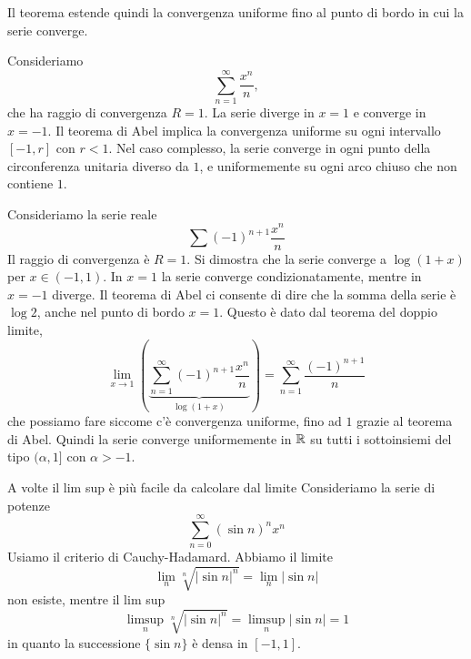 \documentclass[a4paper]{article}
\begin{document}
\begin{radioactive}
Il teorema estende quindi la convergenza uniforme fino al punto di bordo in cui la serie converge.
\end{radioactive}

\begin{radioactive}
\begin{snippetexample}{}
    Consideriamo
    \[
        \sum_{n=1}^\infty\frac{x^n}{n},
    \]
    che ha raggio di convergenza \(R=1\). La serie diverge in \(x=1\) e converge
    in \(x=-1\). Il teorema di Abel implica la convergenza uniforme su ogni
    intervallo \([-1,r]\) con \(r<1\). Nel caso complesso, la serie converge in ogni
    punto della circonferenza unitaria diverso da \(1\), e uniformemente su ogni arco
    chiuso che non contiene \(1\).
\end{snippetexample}
\end{radioactive}

\begin{radioactive}
\begin{snippetexample}{}
    Consideriamo la serie reale
    \[
        \sum {(-1)}^{n+1} \frac{x^n}{n}
    \]
    Il raggio di convergenza è \(R=1\).
    Si dimostra che la serie converge a \(\log(1 + x)\)
    per \(x \in (-1, 1)\).
    In \(x=1\) la serie converge condizionatamente, mentre in \(x=-1\) diverge.
    Il teorema di Abel ci consente di dire che la somma della serie è \(\log 2\),
    anche nel punto di bordo \(x=1\).
    Questo è dato dal teorema del doppio limite,
    \[
        \lim_{x\to 1} \left(
            \underbrace{\sum_{n=1}^\infty {(-1)}^{n+1} \frac{x^n}{n}}_{\log(1+x)}
        \right) = \sum_{n=1}^\infty \frac{{(-1)}^{n+1}}{n}
    \]
    che possiamo fare siccome c'è convergenza uniforme, fino ad \(1\)
    grazie al teorema di Abel.
    Quindi la serie converge uniformemente in \(\mathbb{R}\)
    su tutti i sottoinsiemi del tipo \((\alpha, 1]\)
    con \(\alpha > -1\).
\end{snippetexample}
\end{radioactive}

\begin{radioactive}
\begin{snippetexample}{A volte il lim sup è più facile da calcolare dal limite}
    Consideriamo la serie di potenze
    \[
        \sum_{n=0}^\infty (\sin n)^n x^n
    \]
    Usiamo il criterio di Cauchy-Hadamard. Abbiamo
    il limite
    \[
        \lim_n \sqrt[n]{
            |\sin n|^n
        } = \lim_n |\sin n|
    \]
    non esiste, mentre il lim sup
    \[
        \limsup_n \sqrt[n]{
            |\sin n|^n
        } = \limsup_n |\sin n| = 1
    \]
    in quanto la successione \(\{\sin n\}\) è densa in \([-1, 1]\).
\end{snippetexample}
\end{radioactive}
\end{document}
